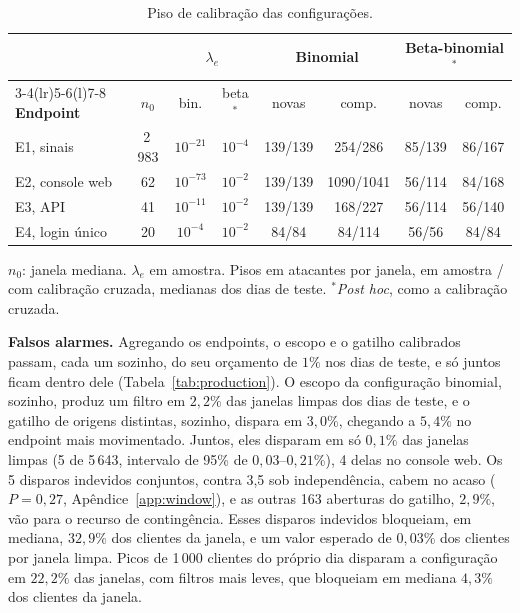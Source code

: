 \documentclass[conference,letterpaper,10pt]{IEEEtran}
\newcommand\1{\textit{(i)}}
\newcommand\2{\textit{(ii)}}
\newcommand\3{\textit{(iii)}}
\begin{document}
\begin{table}[t]
\centering
\caption{Piso de calibração das configurações.}
\label{tab:floor}
\scriptsize
\setlength{\tabcolsep}{2.0pt}
\begin{tabular}{@{}lccccccc@{}}
\toprule
 & & \multicolumn{2}{c}{$\lambda_e$} & \multicolumn{2}{c}{\textbf{Binomial}} & \multicolumn{2}{c}{\textbf{Beta-binomial}$^{*}$} \\
\cmidrule(lr){3-4}\cmidrule(lr){5-6}\cmidrule(l){7-8}
\textbf{Endpoint} & $n_0$ & bin. & beta$^{*}$ & novas & comp. & novas & comp. \\
\midrule
E1, sinais      & 2\,983  & $10^{-21}$ & $10^{-4}$ & 139/139 & 254/286   & 85/139 & 86/167 \\
E2, console web & 62      & $10^{-73}$ & $10^{-2}$ & 139/139 & 1090/1041 & 56/114 & 84/168 \\
E3, API         & 41      & $10^{-11}$ & $10^{-2}$ & 139/139 & 168/227   & 56/114 & 56/140 \\
E4, login único & 20      & $10^{-4}$  & $10^{-2}$ & 84/84   & 84/114    & 56/56  & 84/84 \\
\bottomrule
\end{tabular}

\vspace{2pt}
{\footnotesize $n_0$: janela mediana. $\lambda_e$ em amostra. Pisos em atacantes por janela, em amostra / com calibração cruzada, medianas dos dias de teste. $^{*}$\textit{Post hoc}, como a calibração cruzada.}
\end{table}

\textbf{Falsos alarmes.} Agregando os endpoints, o escopo e o gatilho calibrados passam, cada um sozinho, do seu orçamento de $1\%$ nos dias de teste, e só juntos ficam dentro dele (Tabela~\ref{tab:production}). O escopo da configuração binomial, sozinho, produz um filtro em $2{,}2\%$ das janelas limpas dos dias de teste, e o gatilho de origens distintas, sozinho, dispara em $3{,}0\%$, chegando a $5{,}4\%$ no endpoint mais movimentado. Juntos, eles disparam em só $0{,}1\%$ das janelas limpas (5 de 5\,643, intervalo de 95\% de $0{,}03$--$0{,}21\%$), 4 delas no console web. Os 5 disparos indevidos conjuntos, contra 3,5 sob independência, cabem no acaso ($P = 0{,}27$, Apêndice~\ref{app:window}), e as outras 163 aberturas do gatilho, $2{,}9\%$, vão para o recurso de contingência. Esses disparos indevidos bloqueiam, em mediana, $32{,}9\%$ dos clientes da janela, e um valor esperado de $0{,}03\%$ dos clientes por janela limpa. Picos de 1\,000 clientes do próprio dia disparam a configuração em $22{,}2\%$ das janelas, com filtros mais leves, que bloqueiam em mediana $4{,}3\%$ dos clientes da janela.
\end{document}
